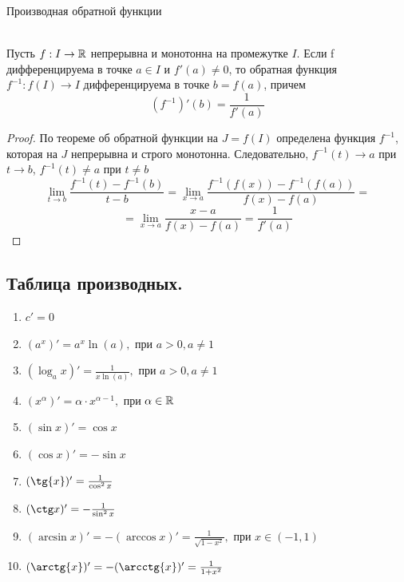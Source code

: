 \begin{theorem}\hypertarget{th4}{Производная обратной функции}
    \\
    Пусть $f: I \to \mathbb{R}$ непрерывна и монотонна на промежутке $I$. Если f дифференцируема в точке $a \in I$ и $f'(a) \neq 0$, то обратная функция $f^{-1}: f(I) \to I$ дифференцируема в точке $b = f(a)$, причем
    \[(f^{-1})'(b) = \frac{1}{f'(a)}\]
\end{theorem}

\begin{proof}
    По теореме об обратной функции на $J = f(I)$ определена функция $f^{-1}$, которая на $J$ непрерывна и строго монотонна. Следовательно, $f^{-1}(t) \to a$ при $t \to b$, $f^{-1}(t) \neq a$ при $t \neq b$
    \[\lim_{t \to b} \frac{f^{-1}(t) - f^{-1}(b)}{t - b} = \lim_{x \to a} \frac{f^{-1}(f(x))-f^{-1}(f(a))}{f(x) - f(a)} =\]
    \[ = \lim_{x \to a}\frac{x - a}{f(x) - f(a)} = \frac{1}{f'(a)}\]
\end{proof}

\newpage

\subsection{Таблица производных.}

\begin{enumerate}
    \item $c' = 0$
    \item $(a^{x})' = a^{x} \ln(a),$ при $a > 0, a \neq 1$
    \item $(\log_{a}x)' = \frac{1}{x \ln(a)},$ при $a > 0, a \neq 1$
    \item $(x^{\alpha})' = \alpha \cdot x^{\alpha - 1},$ при $\alpha \in \mathbb{R}$
    \item $(\sin{x})' = \cos{x}$
    \item $(\cos{x})' = - \sin{x}$
    \item $(\tg{x})' = \frac{1}{\cos^{2}{x}}$
    \item $(\ctg x)' = - \frac{1}{\sin^{2}{x}}$
    \item $(\arcsin{x})' = - (\arccos{x})' = \frac{1}{\sqrt{1 - x^{2}}},$ при $x \in (-1, 1)$
    \item $(\arctg {x})' = - (\arcctg{x})' = \frac{1}{1 + x^{2}}$
\end{enumerate}

